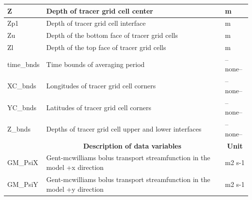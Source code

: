 \begin{longtable}{|m{}|m{}|m{}|}
Z &Depth of tracer grid cell center &m  \\ \hline
Zp1 &Depth of tracer grid cell interface &m  \\ \hline
Zu &Depth of the bottom face of tracer grid cells &m  \\ \hline
Zl &Depth of the top face of tracer grid cells &m  \\ \hline
time\_bnds &Time bounds of averaging period &--none--  \\ \hline
XC\_bnds &Longitudes of tracer grid cell corners &--none--  \\ \hline
YC\_bnds &Latitudes of tracer grid cell corners &--none--  \\ \hline
Z\_bnds &Depths of tracer grid cell upper and lower interfaces &--none--  \\ \hline
\rowcolor{lightgray} \multicolumn{1}{|c|}{\textbf{Variables}} & \multicolumn{1}{|c|}{\textbf{Description of data variables}} &  \multicolumn{1}{|c|}{\textbf{Unit}}\\ \hline
GM\_PsiX &Gent-mcwilliams bolus transport streamfunction in the model +x direction &m2 s-1  \\ \hline
GM\_PsiY &Gent-mcwilliams bolus transport streamfunction in the model +y direction &m2 s-1  \\ \hline
\end{longtable}

\newp
\pagebreak
